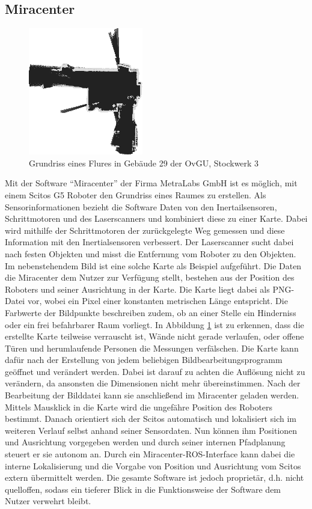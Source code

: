 \subsection{Miracenter}
\begin{figure}
\centering
\includegraphics[scale=0.9]{Bilder/Flur}
\caption{Grundriss eines Flures in Gebäude 29 der OvGU, Stockwerk 3}
\label{fig:Flur}
\end{figure}
Mit der Software "`Miracenter"' der Firma MetraLabs GmbH ist es möglich, mit einem Scitos G5 Roboter den Grundriss eines Raumes zu erstellen. Als Sensorinformationen bezieht die Software Daten von den Inertailsensoren, Schrittmotoren und des Laserscanners und kombiniert diese zu einer Karte. Dabei wird mithilfe der Schrittmotoren der zurückgelegte Weg gemessen und diese Information mit den Inertialsensoren verbessert. Der Laserscanner sucht dabei nach festen Objekten und misst die Entfernung vom Roboter zu den Objekten. Im nebenstehendem Bild ist eine solche Karte als Beispiel aufgeführt. Die Daten die Miracenter dem Nutzer zur Verfügung stellt, bestehen aus der Position des Roboters und seiner Ausrichtung in der Karte. Die Karte liegt dabei als PNG-Datei vor, wobei ein Pixel einer konstanten metrischen Länge entspricht. Die Farbwerte der Bildpunkte beschreiben zudem, ob an einer Stelle ein Hinderniss oder ein frei befahrbarer Raum vorliegt. In Abbildung \ref{fig:Flur} ist zu erkennen, dass die erstellte Karte teilweise verrauscht ist, Wände nicht gerade verlaufen, oder offene Türen und herumlaufende Personen die Messungen verfälschen. Die Karte kann dafür nach der Erstellung von jedem beliebigen Bildbearbeitungsprogramm geöffnet und verändert werden. Dabei ist darauf zu achten die Auflösung nicht zu verändern, da ansonsten die Dimensionen nicht mehr übereinstimmen. Nach der Bearbeitung der Bilddatei kann sie anschließend im Miracenter geladen werden. Mittels Mausklick in die Karte wird die ungefähre Position des Roboters bestimmt. Danach orientiert sich der Scitos automatisch und lokalisiert sich im weiteren Verlauf selbst anhand seiner Sensordaten. Nun können ihm Positionen und Ausrichtung vorgegeben werden und durch seiner internen Pfadplanung steuert er sie autonom an. Durch ein Miracenter-ROS-Interface kann dabei die interne Lokalisierung und die Vorgabe von Position und Ausrichtung vom Scitos extern übermittelt werden. Die gesamte Software ist jedoch proprietär, d.h. nicht quelloffen, sodass ein tieferer Blick in die Funktionsweise der Software dem Nutzer verwehrt bleibt.
